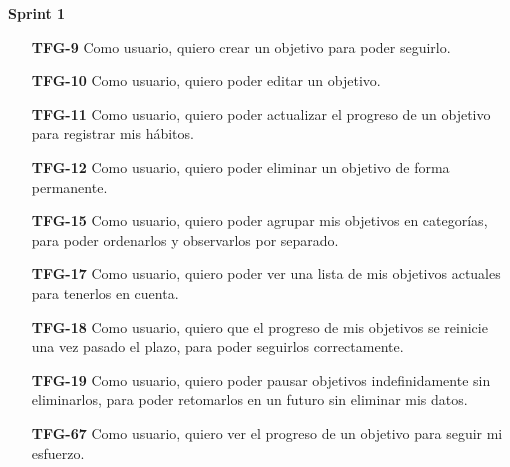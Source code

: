 \documentclass[10pt, a4paper]{aqademic}
\begin{document}
\textbf{Sprint 1}
\begin{itemize}[leftmargin=16mm]
	\item [\textbf{TFG-9}] Como usuario, quiero crear un objetivo para poder seguirlo.
	
	\item [\textbf{TFG-10}] Como usuario, quiero poder editar un objetivo.
	
	\item [\textbf{TFG-11}] Como usuario, quiero poder actualizar el progreso de un objetivo para registrar mis hábitos.
	
	\item [\textbf{TFG-12}] Como usuario, quiero poder eliminar un objetivo de forma permanente.
	
	\item [\textbf{TFG-15}] Como usuario, quiero poder agrupar mis objetivos en categorías, para poder ordenarlos y observarlos por separado.
	
	\item [\textbf{TFG-17}] Como usuario, quiero poder ver una lista de mis objetivos actuales para tenerlos en cuenta.
	
	\item [\textbf{TFG-18}] Como usuario, quiero que el progreso de mis objetivos se reinicie una vez pasado el plazo, para poder seguirlos correctamente.

	
	\item [\textbf{TFG-19}] Como usuario, quiero poder pausar objetivos indefinidamente sin eliminarlos, para poder retomarlos en un futuro sin eliminar mis datos.
	
	\item [\textbf{TFG-67}] Como usuario, quiero ver el progreso de un objetivo para seguir mi esfuerzo.
\end{itemize}
\end{document}
